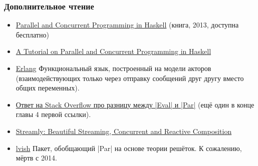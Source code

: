 \documentclass[11pt]{beamer}
\begin{document}
\begin{frame}[fragile]
  \frametitle{Дополнительное чтение}
  \begin{itemize}
    \item \href{https://simonmar.github.io/pages/pcph.html}{Parallel and Concurrent Programming in Haskell} (книга, 2013, доступна бесплатно)
    \item \href{https://www.microsoft.com/en-us/research/wp-content/uploads/2016/02/parallel_haskell2.pdf}{A Tutorial on Parallel and Concurrent Programming in Haskell}
    \item \href{https://erlang.org/}{Erlang} Функциональный язык, построенный на модели акторов (взаимодействующих только через отправку сообщений друг другу вместо общих переменных).
    \item \href{https://stackoverflow.com/questions/23326920/difference-between-par-monad-and-eval-monad-with-deepseq/23428610#23428610}{Ответ на Stack Overflow про разницу между \haskinline|Eval| и \haskinline|Par|} (ещё один в конце главы 4 первой ссылки).
    \item \href{https://hackage.haskell.org/package/streamly}{Streamly: Beautiful Streaming, Concurrent and Reactive Composition}
    \item \href{https://hackage.haskell.org/package/lvish}{lvish} Пакет, обобщающий \haskinline|Par| на основе теории решёток. К сожалению, мёртв с 2014.
  \end{itemize}
\end{frame}
\end{document}
